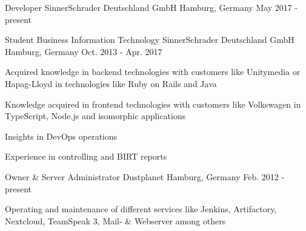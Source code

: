 

\begin{cventries}

  \cventry
    {Developer} %
    {SinnerSchrader Deutschland GmbH} %
    {Hamburg, Germany} %
    {May 2017 - present} %
    {
    }

  \cventry
    {Student Business Information Technology} %
    {SinnerSchrader Deutschland GmbH} %
    {Hamburg, Germany} %
    {Oct. 2013 - Apr. 2017} %
    {
      \begin{cvitems} %
        \item {Acquired knowledge in backend technologies with customers like Unitymedia or Hapag-Lloyd in technologies like Ruby on Rails and Java}
        \item {Knowledge acquired in frontend technologies with customers like Volkswagen in TypeScript, Node.js and isomorphic applications}
        \item {Insights in DevOps operations}
        \item {Experience in controlling and BIRT reports}
      \end{cvitems}
    }

  \cventry
    {Owner \& Server Administrator} %
    {Dustplanet} %
    {Hamburg, Germany} %
    {Feb. 2012 - present} %
    {
      \begin{cvitems} %
      	\item {Operating and maintenance of different services like Jenkins, Artifactory, Nextcloud, TeamSpeak 3, Mail- \& Webserver among others}
      \end{cvitems}
    }

\end{cventries}
